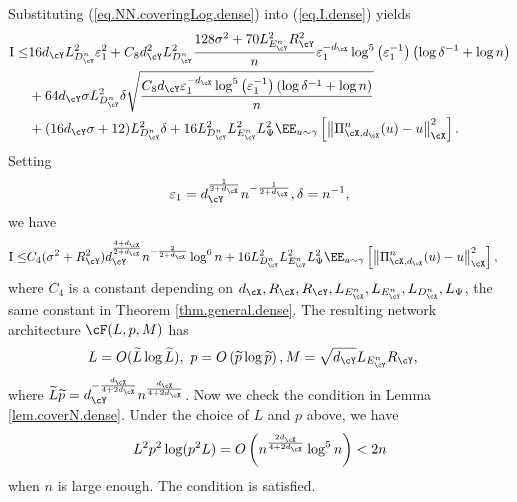 \documentclass[11pt]{article} %
\begin{document}
Substituting (\ref{eq.NN.coveringLog.dense}) into (\ref{eq.I.dense}) yields
\begin{align}
	{\rm I}\leq &16d_{\cY}L_{D^n_{\cY}}^2\varepsilon_1^2+C_{8}d^2_{\cY}L_{D^n_{\cY}}^2\frac{128\sigma^2+70L_{E^n_{\cY}}^2R_{\cY}^2}{n}\varepsilon_1^{-d_{\cX}}\log^5\left(\varepsilon_1^{-1}\right)\left(\log \delta^{-1}+\log n\right)  \nonumber\\
	&+ 64d_{\cY}\sigma L_{D^n_{\cY}}^2\delta \sqrt{\frac{C_{8} d_{\cY}\varepsilon_1^{-d_{\cX}}\log^5\left(\varepsilon_1^{-1}\right)\left(\log \delta^{-1}+\log n\right) }{n}} \nonumber \\
	& +(16d_{\cY}\sigma+12) L_{D^n_{\cY}}^2 \delta +16L_{D^n_{\cY}}^2 L_{E^n_{\cY}}^2L_{\Psi}^2\EE_{u\sim \gamma}\left[ \left\| \Pi_{\cX,d_{\cX}}^n(u)- u\right\|_{\cX}^2\right].
	\label{eq.I.1.dense}
\end{align}
Setting
$$\varepsilon_1=d_{\cY}^{\frac{1}{2+d_{\cX}}}n^{-\frac{1}{2+d_{\cX}}}, \delta=n^{-1},$$
we have
\begin{align}
	{\rm I}\leq &C_{4}(\sigma^2+R_{\cY}^2)d_{\cY}^{\frac{4+d_{\cX}}{2+d_{\cX}}}n^{-\frac{2}{2+d_{\cX}}}\log^6 n  + 16L_{D^n_{\cY}}^2 L_{E^n_{\cY}}^2L_{\Psi}^2\EE_{u\sim \gamma}\left[ \left\| \Pi_{\cX,d_{\cX}}^n(u)- u\right\|_{\cX}^2\right],
	\label{eq.I.2.dense}
\end{align}
where $C_{4}$ is a constant depending on $d_{\cX},R_{\cX},R_{\cY},L_{E^n_{\cX}}, L_{E^n_{\cY}},L_{D^n_{\cX}},L_{\Psi}$, the same constant in Theorem \ref{thm.general.dense}. The resulting network architecture $\cF(L,p,M)$ has
\begin{equation}
	\begin{aligned}
		&L=O(\widetilde{L}\log \widetilde{L}), \ p=O\left(\widetilde{p} \log \widetilde{p}\right), M=\sqrt{d_{\cY}}L_{E^n_{\cY}}R_{\cY},
	\end{aligned}
	\label{eq.NN.parameter.n.1.dense}
\end{equation}
where $\widetilde{L}\widetilde{p}=d_{\cY}^{-\frac{d_{\cX}}{4+2d_{\cX}}}n^{\frac{d_{\cX}}{4+2d_{\cX}}}$. Now we check the condition in Lemma \ref{lem.coverN.dense}. Under the choice of $L$ and $p$ above, we have
\begin{align*}
	L^2p^2\log(p^2L)=O\left(n^{\frac{2d_{\cX}}{4+2d_{\cX}}}\log^5 n \right)<2n
\end{align*}
when $n$ is large enough. The condition is satisfied.
\end{document}
